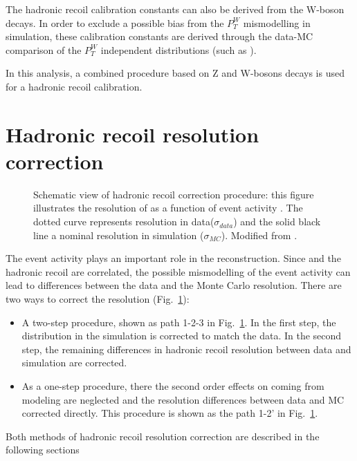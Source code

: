 The hadronic recoil calibration constants can also be  derived from the W-boson decays. In order to exclude a possible bias from the $P_T^W$ mismodelling in simulation, these calibration constants are derived through the data-MC comparison of the $P_T^{W}$ independent distributions (such as \mtw).  

In this analysis, a combined procedure based on Z and W-bosons decays is used for a hadronic recoil calibration.


\section{Hadronic recoil resolution correction}\label{sec:HRReso}

\begin{figure}[!t]
\begin{center}

\begin{minipage}[h]{0.7\linewidth}
\end{minipage}

\end{center}
\caption{Schematic view of hadronic recoil correction procedure: this figure illustrates the resolution of \uperp as a function of event activity \sumet. The dotted curve represents \uperp resolution in data($\sigma_{data}$) and the solid black line a nominal \uperp resolution in simulation ($\sigma_{MC}$). Modified from \cite{HRCorrections}.}

\label{ris:sumetCor}
\end{figure}


The event activity plays an important role in the \etmiss reconstruction. Since \sumet and the hadronic recoil are correlated, the possible mismodelling of the event activity can lead to differences between the data and the Monte Carlo \etmiss resolution. There are two ways to correct the resolution (Fig.~\ref{ris:sumetCor}):
\begin{itemize}
\item A two-step procedure, shown as path 1-2-3 in Fig.~\ref{ris:sumetCor}. In the first step, the \sumet distribution in the simulation is corrected to match the data. In the second step, the remaining differences in hadronic recoil resolution between data and simulation are corrected.
\item As a one-step procedure, there the second order effects on \etmiss coming from \sumet modeling are neglected and the resolution differences between data and MC corrected directly. This procedure is shown as the path 1-2' in Fig.~\ref{ris:sumetCor}.
\end{itemize}
Both methods of hadronic recoil resolution correction are described in the following sections

